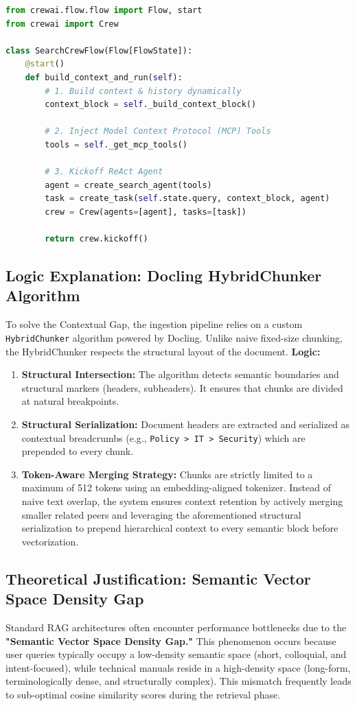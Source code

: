 \documentclass[12pt]{article}
\begin{document}
\begin{lstlisting}[language=python, caption=CrewAI State-Driven Flow Implementation]
from crewai.flow.flow import Flow, start
from crewai import Crew

class SearchCrewFlow(Flow[FlowState]):
    @start()
    def build_context_and_run(self):
        # 1. Build context & history dynamically
        context_block = self._build_context_block()

        # 2. Inject Model Context Protocol (MCP) Tools
        tools = self._get_mcp_tools()

        # 3. Kickoff ReAct Agent
        agent = create_search_agent(tools)
        task = create_task(self.state.query, context_block, agent)
        crew = Crew(agents=[agent], tasks=[task])

        return crew.kickoff()
\end{lstlisting}

\subsection{Logic Explanation: Docling HybridChunker Algorithm}
To solve the Contextual Gap, the ingestion pipeline relies on a custom \texttt{HybridChunker} algorithm powered by Docling. Unlike naive fixed-size chunking, the HybridChunker respects the structural layout of the document.
\textbf{Logic:}
\begin{enumerate}
    \item \textbf{Structural Intersection:} The algorithm detects semantic boundaries and structural markers (headers, subheaders). It ensures that chunks are divided at natural breakpoints.
    \item \textbf{Structural Serialization:} Document headers are extracted and serialized as contextual breadcrumbs (e.g., \texttt{Policy > IT > Security}) which are prepended to every chunk.
    \item \textbf{Token-Aware Merging Strategy:} Chunks are strictly limited to a maximum of 512 tokens using an embedding-aligned tokenizer. Instead of naive text overlap, the system ensures context retention by actively merging smaller related peers and leveraging the aforementioned structural serialization to prepend hierarchical context to every semantic block before vectorization.
\end{enumerate}

\subsection{Theoretical Justification: Semantic Vector Space Density Gap}
Standard RAG architectures often encounter performance bottlenecks due to the \textbf{"Semantic Vector Space Density Gap."} This phenomenon occurs because user queries typically occupy a low-density semantic space (short, colloquial, and intent-focused), while technical manuals reside in a high-density space (long-form, terminologically dense, and structurally complex). This mismatch frequently leads to sub-optimal cosine similarity scores during the retrieval phase.
\end{document}
